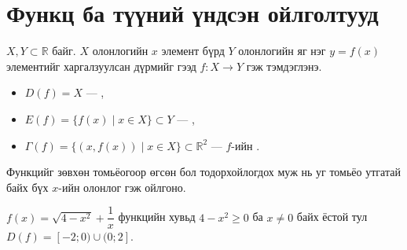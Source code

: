 \providecommand{\R}{\mathbb{R}}
\providecommand{\N}{\mathbb{N}}
\providecommand{\tg}{\operatorname{tg}}
\providecommand{\ctg}{\operatorname{ctg}}
\providecommand{\arctg}{\operatorname{arctg}}
\providecommand{\arcctg}{\operatorname{arcctg}}


\section{Функц ба түүний үндсэн ойлголтууд}

\begin{definition}[Функц]
$X,Y\subset\R$ байг. $X$ олонлогийн $x$ элемент бүрд $Y$ олонлогийн яг нэг
$y=f(x)$ элементийг харгалзуулсан дүрмийг  гээд $f:X\to Y$ гэж тэмдэглэнэ.
\begin{itemize}
  \item $D(f)=X$ — ,
  \item $E(f)=\{f(x)\mid x\in X\}\subset Y$ — ,
  \item $\Gamma(f)=\{(x,f(x))\mid x\in X\}\subset\R^2$ — $f$-ийн .
\end{itemize}
\end{definition}

\begin{remark}
Функцийг зөвхөн томьёогоор өгсөн бол тодорхойлогдох муж нь уг томьёо утгатай байх
бүх $x$-ийн олонлог гэж ойлгоно.
\end{remark}

\begin{example}
$f(x)=\sqrt{4-x^2}+\dfrac{1}{x}$ функцийн хувьд $4-x^2\ge 0$ ба $x\neq0$ байх ёстой тул
$D(f)=[-2;0)\cup(0;2]$.
\end{example}

